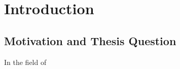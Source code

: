 \chapter{Introduction}
\label{ch:intro}


%
%
\section{Motivation and Thesis Question}
\label{sec:intro:motivation}
In the field of 
